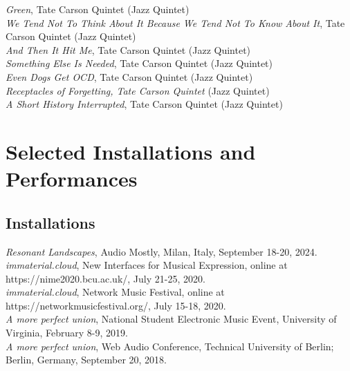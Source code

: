 \documentclass[12pt, a4paper]{article}
\newcommand{\years}[1]{\marginnote{\scriptsize #1}}
\begin{document}
\textit{Green}, Tate Carson Quintet (Jazz Quintet)\\
\textit{We Tend Not To Think About It Because We Tend Not To Know About It}, Tate Carson Quintet (Jazz Quintet) \\
\textit{And Then It Hit Me}, Tate Carson Quintet (Jazz Quintet)\\
\textit{Something Else Is Needed}, Tate Carson Quintet (Jazz Quintet)\\
\textit{Even Dogs Get OCD}, Tate Carson Quintet (Jazz Quintet)\\
\textit{Receptacles of Forgetting, Tate Carson Quintet} (Jazz Quintet)\\
\textit{A Short History Interrupted}, Tate Carson Quintet (Jazz Quintet)\\ 

\section*{Selected Installations and Performances}

\subsection*{Installations}
\years{2024} \textit{Resonant Landscapes}, Audio Mostly, Milan, Italy, September 18-20, 2024.\\  
\years{2020}\textit{immaterial.cloud}, New Interfaces for Musical Expression, online at https://nime2020.bcu.ac.uk/, July 21-25, 2020. \\
\textit{immaterial.cloud}, Network Music Festival, online at https://networkmusicfestival.org/, July 15-18, 2020.\\
\years{2019} \textit{A more perfect union}, National Student Electronic Music Event, University of Virginia, February 8-9, 2019.\\  
\years{2018} \textit{A more perfect union}, Web Audio Conference, Technical University of Berlin; Berlin, Germany, September 20, 2018.
\end{document}
